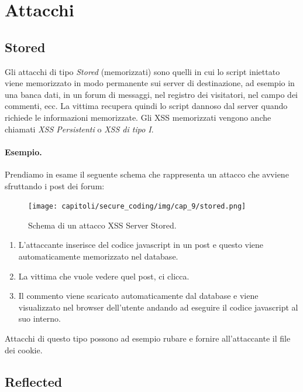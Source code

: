 \section{Attacchi}

\subsection{Stored}

Gli attacchi di tipo \textit{Stored} (memorizzati) sono quelli in cui lo script iniettato viene memorizzato in
modo permanente sui server di destinazione, ad esempio in una banca dati, in un forum di messaggi, nel registro dei visitatori, nel campo dei commenti, ecc.
La vittima recupera quindi lo script dannoso dal server quando richiede le informazioni memorizzate.
Gli XSS memorizzati vengono anche chiamati \textit{XSS Persistenti} o \textit{XSS di tipo I}.

\paragraph{Esempio.}
Prendiamo in esame il seguente schema che rappresenta un attacco che avviene
sfruttando i post dei forum:

\begin{figure}[H]
      \centering
      \texttt{[image: capitoli/secure\_coding/img/cap\_9/stored.png]}
      \caption{Schema di un attacco XSS Server Stored.}
\end{figure}

\begin{enumerate}
      \item L'attaccante inserisce del codice javascript in un post e questo viene
            automaticamente memorizzato nel database.
      \item La vittima che vuole vedere quel post, ci clicca.
      \item Il commento viene scaricato automaticamente dal database e viene
            visualizzato nel browser dell'utente andando ad eseguire il codice
            javascript al suo interno.
\end{enumerate}

Attacchi di questo tipo possono ad esempio rubare e
fornire all'attaccante il file dei cookie.

\subsection{Reflected}

